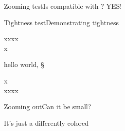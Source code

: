 \begin{slide}{Zooming test}{Is  compatible with ? YES!}
  \begin{nicscolumn}
  \end{nicscolumn}
\end{slide}

\begin{slide}{Tightness test}{Demonstrating tightness}
  \begin{nicscolumn}
    \noindent xxxx\\x
    \begin{nicsterm}
      hello world, §
    \end{nicsterm}
    x\\xxxx
  \end{nicscolumn}
\end{slide}

\begin{slide}{Zooming out}{Can it be small?}
  \begin{nicscolumn}
  \end{nicscolumn}
\end{slide}

\begin{slide}{}{It's just a differently colored }
  \begin{nicscolumn}
  \end{nicscolumn}
\end{slide}


